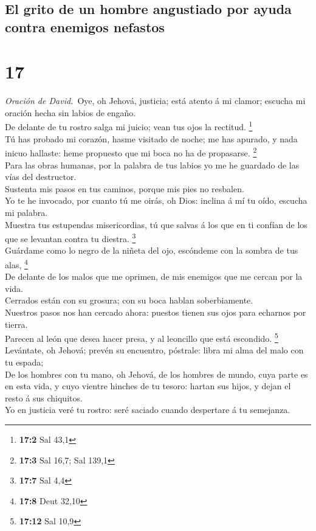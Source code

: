 \hypertarget{el-grito-de-un-hombre-angustiado-por-ayuda-contra-enemigos-nefastos}{%
\subsection{El grito de un hombre angustiado por ayuda contra enemigos
nefastos}\label{el-grito-de-un-hombre-angustiado-por-ayuda-contra-enemigos-nefastos}}

\hypertarget{section-16}{%
\section{17}\label{section-16}}

 \emph{Oración de David.}~Oye, oh Jehová, justicia; está
atento á mi clamor; escucha mi oración hecha sin labios de engaño.\\
 De delante de tu rostro salga mi juicio; vean tus ojos la
rectitud. \footnote{\textbf{17:2} Sal 43,1}\\
 Tú has probado mi corazón, hasme visitado de noche; me has
apurado, y nada inicuo hallaste: heme propuesto que mi boca no ha de
propasarse. \footnote{\textbf{17:3} Sal 16,7; Sal 139,1}\\
 Para las obras humanas, por la palabra de tus labios yo me
he guardado de las vías del destructor.\\
 Sustenta mis pasos en tus caminos, porque mis pies no
resbalen.\\
 Yo te he invocado, por cuanto tú me oirás, oh Dios: inclina
á mí tu oído, escucha mi palabra.\\
 Muestra tus estupendas misericordias, tú que salvas á los
que en ti confían de los que se levantan contra tu diestra.
\footnote{\textbf{17:7} Sal 4,4}\\
 Guárdame como lo negro de la niñeta del ojo, escóndeme con
la sombra de tus alas, \footnote{\textbf{17:8} Deut 32,10}\\
 De delante de los malos que me oprimen, de mis enemigos que
me cercan por la vida.\\
 Cerrados están con su grosura; con su boca hablan
soberbiamente.\\
 Nuestros pasos nos han cercado ahora: puestos tienen sus
ojos para echarnos por tierra.\\
 Parecen al león que desea hacer presa, y al leoncillo que
está escondido. \footnote{\textbf{17:12} Sal 10,9}\\
 Levántate, oh Jehová; prevén su encuentro, póstrale: libra
mi alma del malo con tu espada;\\
 De los hombres con tu mano, oh Jehová, de los hombres de
mundo, cuya parte es en esta vida, y cuyo vientre hinches de tu tesoro:
hartan sus hijos, y dejan el resto á sus chiquitos.\\
 Yo en justicia veré tu rostro: seré saciado cuando
despertare á tu semejanza.

